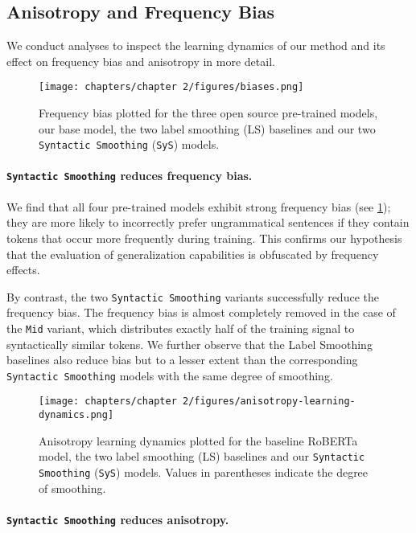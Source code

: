 \subsection{Anisotropy and Frequency Bias}
We conduct analyses to inspect the learning dynamics of our method and its effect on frequency bias and anisotropy in more detail. 
\begin{figure}[h]
    \centering
    \texttt{[image: chapters/chapter 2/figures/biases.png]}
    \caption{Frequency bias plotted for the three open source pre-trained models, our base model, the two label smoothing (LS) baselines and our two \texttt{Syntactic Smoothing} (\texttt{SyS}) models.}
    \label{fig:biases}
    \vspace{-1em}
\end{figure}

\paragraph{\texttt{Syntactic Smoothing} reduces frequency bias.}
We find that all four pre-trained models exhibit strong frequency bias (see \cref{fig:biases}); they are more likely to incorrectly prefer ungrammatical sentences if they contain tokens that occur more frequently during training. This confirms our hypothesis that the evaluation of generalization capabilities is obfuscated by frequency effects. 

By contrast, the two \texttt{Syntactic Smoothing} variants successfully reduce the frequency bias. The frequency bias is almost completely removed in the case of the \texttt{Mid} variant, which distributes exactly half of the training signal to syntactically similar tokens. We further observe that the Label Smoothing baselines also reduce bias but to a lesser extent than the corresponding \texttt{Syntactic Smoothing} models with the same degree of smoothing. 

\begin{figure}[h!]
    \centering
    \texttt{[image: chapters/chapter 2/figures/anisotropy-learning-dynamics.png]}
    \caption{Anisotropy learning dynamics plotted for the baseline RoBERTa model, the two label smoothing (LS) baselines and our \texttt{Syntactic Smoothing} (\texttt{SyS}) models. Values in parentheses indicate the degree of smoothing.}
    \label{fig:anisotropy-learing-dynamics}
    \vspace{-1em}
\end{figure}

\paragraph{\texttt{Syntactic Smoothing} reduces anisotropy.}

